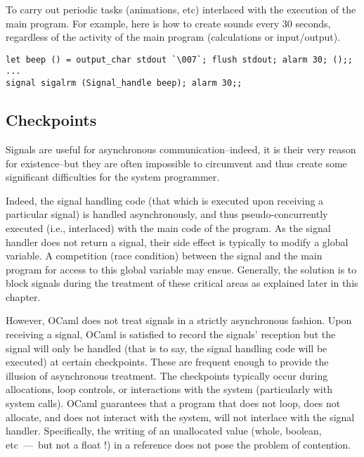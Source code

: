 \begin{example} 
To carry out periodic tasks (animations, etc) interlaced with
the execution of the main program.  For example, here is how
to create  sounds every 30 seconds, regardless of
the activity of the main program (calculations or input/output).

\begin{lstlisting}
let beep () = output_char stdout `\007`; flush stdout; alarm 30; ();;
...
signal sigalrm (Signal_handle beep); alarm 30;;
\end{lstlisting}
\end{example}

\subsection*{Checkpoints}

Signals are useful for asynchronous communication--indeed, it is their 
very reason for existence--but they are often impossible to 
circumvent and thus create some significant difficulties for the
system programmer.

Indeed, the signal handling code (that which is executed upon 
receiving a particular signal) is handled asynchronously, and thus 
pseudo-concurrently executed (i.e., interlaced) with the main 
code of the program.  As the signal handler does not return
a signal, their side effect is typically to modify a global variable.
A competition (race condition) between the signal and the main program 
for access to this global variable may ensue.  Generally, the solution
is to block signals during the treatment of these critical areas as 
explained later in this chapter.  

However, OCaml does not treat signals in a strictly asynchronous
fashion.  Upon receiving a signal, OCaml is satisfied to record the
signals' reception but the signal will only be handled (that is to
say, the signal handling code will be executed) at certain
checkpoints.  These are frequent enough to provide the illusion of
asynchronous treatment.  The checkpoints typically occur during
allocations, loop controls, or interactions with the system
(particularly with system calls).  OCaml guarantees that a program
that does not loop, does not allocate, and does not interact with the
system, will not interlace with the signal handler.  Specifically, the
writing of an unallocated value (whole, boolean, etc~---~but not a
float !) in a reference does not pose the problem of contention.

